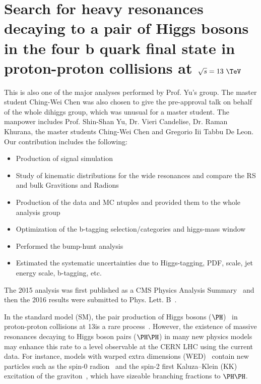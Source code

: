 \section{Search for heavy resonances decaying to a pair of Higgs bosons in the four b quark final state in proton-proton collisions at $\sqrt{s}=13~\TeV$ \label{sec:hh}}

This is also one of the major analyses performed by Prof. Yu's group. The master student Ching-Wei Chen was also chosen to give the pre-approval talk on behalf of the whole dihiggs group, which was unusual for a master student. The manpower includes Prof. Shin-Shan Yu, Dr. Vieri Candelise, Dr. Raman Khurana, the master students Ching-Wei Chen and Gregorio Iii Tabbu De Leon. Our contribution includes the following:
\begin{itemize}
\item Production of signal simulation
\item Study of kinematic distributions for the wide resonances and compare the RS and bulk Gravitions and Radions
\item Production of the data and MC ntuples and provided them to the whole analysis group
\item Optimization of the b-tagging selection/categories and higgs-mass window
\item Performed the bump-hunt analysis
\item Estimated the systematic uncertainties due to Higgs-tagging, PDF, scale, jet energy scale, b-tagging, etc.
\end{itemize}
The 2015 analysis was first published as a CMS Physics Analysis Summary~\cite{CMS-PAS-B2G-16-008} and then the 2016 results were submitted to Phys. Lett. B~\cite{Sirunyan:2017isc}.

In the standard model (SM), the pair production of Higgs bosons ($\PH$)~\cite{HiggsDiscoveryAtlas,HiggsDiscoveryCMS,CMSHiggsLongPaper} in 
proton-proton collisions at 13\TeV is a rare process~\cite{deFlorian:2013jea}.
However, the existence of massive resonances decaying to Higgs boson pairs ($\PH\PH$) in many new physics models may enhance this rate to a 
level observable at the CERN LHC using the current data.
For instance, models with warped extra dimensions (WED)~\cite{Randall:1999ee} contain new particles such as the spin-0 radion~\cite{Goldberger:1999uk,DeWolfe:1999cp,Csaki:1999mp} and the spin-2 first Kaluza--Klein (KK) excitation of the graviton~\cite{Davoudiasl:1999jd,Csaki:2000zn, Agashe:2007zd}, which have sizeable branching fractions to $\PH\PH$.

